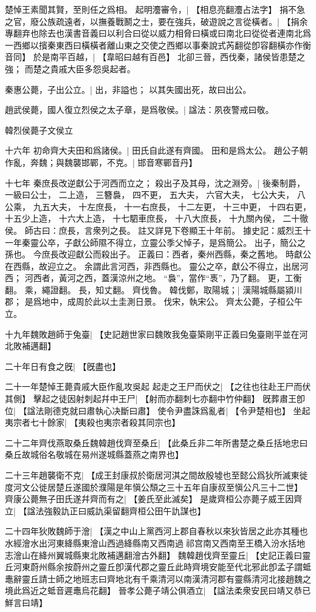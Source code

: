 楚悼王素聞其賢，至則任之爲相。%
起明灋審令，|{
	【相息亮翻灋占法字】}
捐不急之官，廢公族疏遠者，以撫養戰鬭之士，要在強兵，破遊說之言從橫者。|{
	【捐余專翻弃也除去也漢書音義曰以利合曰從以威力相脅曰橫或曰南北曰從從者連南北爲一西鄉以擯秦東西曰橫橫者離山東之交使之西鄉以事秦說式芮翻從卽容翻橫亦作衡音同】}
於是南平百越，|{
	【韋昭曰越有百邑】}
北卻三晉，西伐秦，諸侯皆患楚之強；
而楚之貴戚大臣多怨吳起者。

秦惠公薨，子出公立。|{
	出，非謚也；
	以其失國出死，故曰出公。
	}

趙武侯薨，國人復立烈侯之太子章，是爲敬侯。|{
	諡法：夙夜警戒曰敬。
	}

韓烈侯薨子文侯立


十六年
初命齊大夫田和爲諸侯。|{
	田氏自此遂有齊國。
	田和是爲太公。
	}
趙公子朝作亂，奔魏；與魏襲邯鄲，不克。|{
	邯音寒鄲音丹】}
\par
十七年
秦庶長改逆獻公于河西而立之；
殺出子及其母，沈之淵旁。|{
	後秦制爵，
	一級曰公士，
	二上造，
	三簪裊，
	四不更，
	五大夫，
	六官大夫，
	七公大夫，
	八公乘，
	九五大夫，
	十左庶長，
	十一右庶長，
	十二左更，
	十三中更，
	十四右更，
	十五少上造，
	十六大上造，
	十七駟車庶長，
	十八大庶長，
	十九關內侯，
	二十徹侯。
	師古曰：庶長，言衆列之長。
	註又詳見下卷顯王十年前。
	據史記：威烈王十一年秦靈公卒，子獻公師隰不得立，立靈公季父悼子，是爲簡公。
	出子，簡公之孫也。
	今庶長改迎獻公而殺出子。
	正義曰：西者，秦州西縣，秦之舊地。
	時獻公在西縣，故迎立之。
	余謂此言河西，非西縣也。
	靈公之卒，獻公不得立，出居河西；
	河西者，黃河之西，蓋漢涼州之地。
	“裊”，當作“褭”，乃了翻。
	更，工衡翻。
	乘，繩證翻。
	長，知丈翻。
	}
齊伐魯。
韓伐鄭，取陽城；|{
	漢陽城縣屬潁川郡；
	是爲地中，成周於此以土圭測日景。
	}
伐宋，執宋公。
齊太公薨，子桓公午立。


十九年魏敗趙師于兔臺|{
	【史記趙世家曰魏敗我兔臺築剛平正義曰兔臺剛平並在河北敗補邁翻】}
\par
二十年日有食之旣|{
	【旣盡也】}
\par



二十一年楚悼王薨貴戚大臣作亂攻吳起 起走之王尸而伏之|{
	【之往也往赴王尸而伏其側】}
擊起之徒因射刺起幷中王尸|{
	【射而亦翻刺七亦翻中竹仲翻】}
旣葬肅王卽位|{
	【諡法剛德克就曰肅執心决斷曰肅】}
使令尹盡誅爲亂者|{
	【令尹楚相也】}
坐起夷宗者七十餘家|{
	【夷殺也夷宗者殺其同宗也】}
\par
二十二年齊伐燕取桑丘魏韓趙伐齊至桑丘|{
	【此桑丘非二年所書楚之桑丘括地忠曰桑丘故城俗名敬城在易州遂城縣蓋燕之南界也】}
\par
二十三年趙襲衛不克|{
	【成王封康叔於衛居河淇之間故殷墟也至懿公爲狄所滅東徙度河文公徙居楚丘遂國於濮陽是年愼公頹之三十五年自康叔至愼公凡三十二世】}
齊康公薨無子田氏遂幷齊而有之|{
	【姜氏至此滅矣】}
是歲齊桓公亦薨子威王因齊立|{
	【諡法強毅訅正曰威訅渠留翻齊桓公田午訅謀也】}
\par
二十四年狄敗魏師于澮|{
	【漢之中山上黨西河上郡自春秋以來狄皆居之此亦其種也水經澮水出河東絳縣東澮山西過絳縣南又西南過祁宫南又西南至王橋入汾水括地志澮山在絳州翼城縣東北敗補邁翻澮古外翻】}
魏韓趙伐齊至靈丘|{
	【史記正義曰靈丘河東蔚州縣余按蔚州之靈丘卽漢代郡之靈丘此時齊境安能至代北邪此卽孟子謂蚳鼃辭靈丘請士師之地班志曰齊地北有千乘清河以南漢清河郡有靈縣清河北接趙魏之境此爲近之蚳音遲鼃烏花翻】}
晉孝公薨子靖公俱酒立|{
	【諡法柔衆安民曰靖又恭已鮮言曰靖】}


